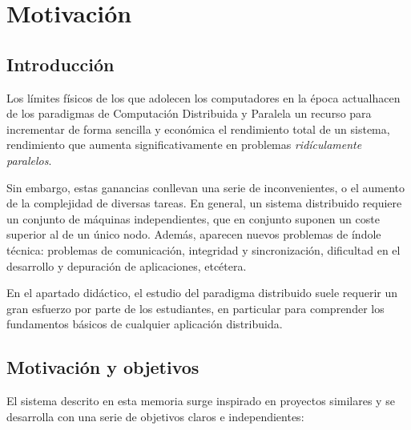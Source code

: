 \chapter{Motivación}

\section{Introducción}

Los límites físicos de los que adolecen los computadores en la época actual\citationneeded hacen de los paradigmas de Computación Distribuida y Paralela un recurso para incrementar de forma sencilla y económica el rendimiento total de un sistema, rendimiento que aumenta significativamente en problemas \textit{ridículamente paralelos}\citationneeded.

Sin embargo, estas ganancias conllevan una serie de inconvenientes, o el aumento de la complejidad de diversas tareas. En general, un sistema distribuido requiere un conjunto de máquinas independientes, que en conjunto suponen un coste superior al de un único nodo. Además, aparecen nuevos problemas de índole técnica: problemas de comunicación, integridad y sincronización, dificultad en el desarrollo y depuración de aplicaciones, etcétera.

En el apartado didáctico, el estudio del paradigma distribuido suele requerir un gran esfuerzo por parte de los estudiantes, en particular para comprender los fundamentos básicos de cualquier aplicación distribuida.

\section{Motivación y objetivos}

El sistema descrito en esta memoria surge inspirado en proyectos similares y se desarrolla con una serie de objetivos claros e independientes:

